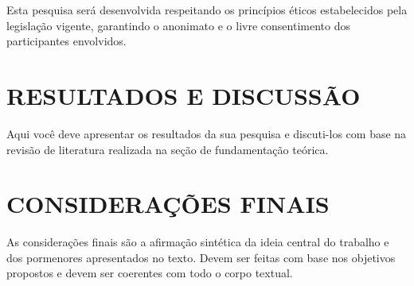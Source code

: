 Esta pesquisa será desenvolvida respeitando os princípios éticos estabelecidos pela legislação vigente, garantindo o anonimato e o livre consentimento dos participantes envolvidos.

\section{RESULTADOS E DISCUSSÃO}
\label{sec:resultados}

Aqui você deve apresentar os resultados da sua pesquisa e discuti-los com base na revisão de literatura realizada na seção de fundamentação teórica.

\section{CONSIDERAÇÕES FINAIS}
\label{sec:consideracoes-finais}

As considerações finais são a afirmação sintética da ideia central do trabalho e dos pormenores apresentados no texto.
Devem ser feitas com base nos objetivos propostos e devem ser coerentes com todo o corpo textual.





